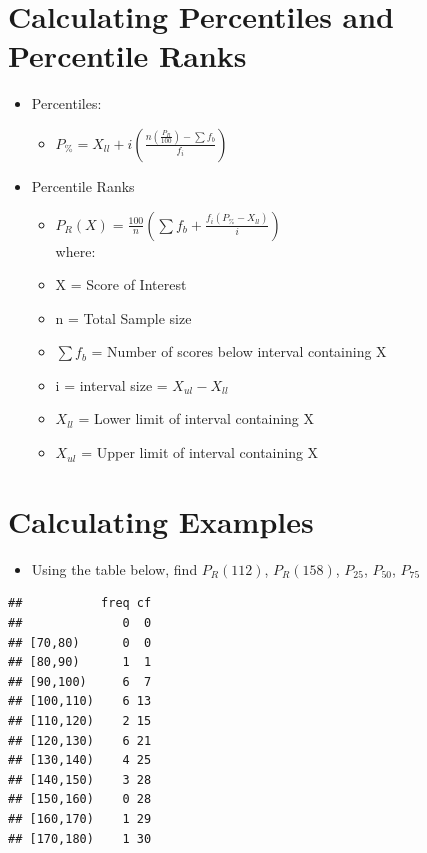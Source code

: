 \documentclass[12pt]{article}
\begin{document}
\section{Calculating Percentiles and Percentile
Ranks}\label{calculating-percentiles-and-percentile-ranks}

\begin{itemize}
\itemsep1pt\parskip0pt
\item
  Percentiles:

  \begin{itemize}
  \itemsep1pt\parskip0pt
  \item
    $ P_{\%} = X_{ll} + i
    \left(\frac{n(\frac{P_{R}}{100}) - \sum f_{b}}{f_{i}}\right) $
  \end{itemize}
\item
  Percentile Ranks

  \begin{itemize}
  \itemsep1pt\parskip0pt
  \item
    $ P_{R}(X) = \frac{100}{n}\left(\sum f_{b} +
    \frac{f_{i}(P_{\%} - X_{ll})}{i}\right)$  
    \\
 where:
  \item
    X = Score of Interest
  \item
    n = Total Sample size
  \item
    \(\sum f_{b}\) = Number of scores below interval containing X
  \item
    i = interval size = \(X_{ul} - X_{ll}\)
  \item
    \(X_{ll}\) = Lower limit of interval containing X
  \item
    \(X_{ul}\) = Upper limit of interval containing X
  \end{itemize}
\end{itemize}

\section{Calculating Examples}\label{calculating-examples}

\begin{itemize}
\itemsep1pt\parskip0pt
\item
  Using the table below, find \(P_{R}(112)\), \(P_{R}(158)\),
  \(P_{25}\), \(P_{50}\), \(P_{75}\)
\end{itemize}

\begin{verbatim}
##           freq cf
##              0  0
## [70,80)      0  0
## [80,90)      1  1
## [90,100)     6  7
## [100,110)    6 13
## [110,120)    2 15
## [120,130)    6 21
## [130,140)    4 25
## [140,150)    3 28
## [150,160)    0 28
## [160,170)    1 29
## [170,180)    1 30
\end{verbatim}
\end{document}
